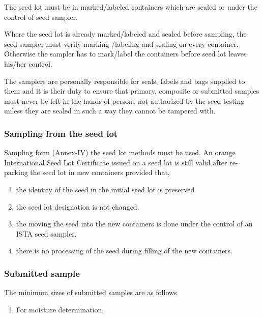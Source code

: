 \documentclass[
]{book}
\providecommand{\tightlist}{%
  \setlength{\itemsep}{0pt}\setlength{\parskip}{0pt}}
\begin{document}
The seed lot must be in marked/labeled containers which are sealed or under the control of seed sampler.

Where the seed lot is already marked/labeled and sealed before sampling, the seed sampler must verify marking /labeling and sealing on every container. Otherwise the sampler has to mark/label the containers before seed lot leaves his/her control.

The samplers are personally responsible for seals, labels and bags supplied to them and it is their duty to ensure that primary, composite or submitted samples must never be left in the hands of persons not authorized by the seed testing unless they are sealed in such a way they cannot be tampered with.

\hypertarget{sampling-from-the-seed-lot}{%
\subsubsection{Sampling from the seed lot}\label{sampling-from-the-seed-lot}}

Sampling form (Annex-IV) the seed lot methods must be used. An orange International Seed Lot Certificate issued on a seed lot is still valid after re-packing the seed lot in new containers provided that,

\begin{enumerate}
\def\labelenumi{\alph{enumi})}
\item
  the identity of the seed in the initial seed lot is preserved
\item
  the seed lot designation is not changed.
\item
  the moving the seed into the new containers is done under the control of an ISTA seed sampler.
\item
  there is no processing of the seed during filling of the new containers.
\end{enumerate}

\hypertarget{submitted-sample-1}{%
\subsubsection{Submitted sample}\label{submitted-sample-1}}

The minimum sizes of submitted samples are as follows

\begin{enumerate}
\def\labelenumi{\alph{enumi})}
\tightlist
\item
  For moisture determination,
\end{enumerate}
\end{document}
